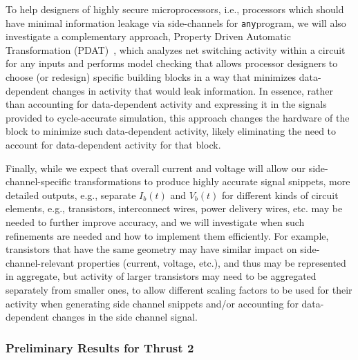 To help designers of highly secure microprocessors, i.e., processors which should have minimal information leakage via side-channels for {\tt any}program, we will also investigate a complementary approach, Property Driven Automatic Transformation (PDAT)~\cite{bleier21}, which analyzes net switching activity within a circuit for any inputs and performs model checking that allows processor designers to choose (or redesign) specific building blocks in a way that minimizes data-dependent changes in activity that would leak information. In essence, rather than accounting for data-dependent activity and expressing it in the signals provided to cycle-accurate simulation, this approach changes the hardware of the block to minimize such data-dependent activity, likely eliminating the need to account for data-dependent activity for that block.

Finally, while we expect that overall current and voltage will allow our side-channel-specific transformations to produce highly accurate signal snippets, more detailed outputs, e.g., separate $I_b(t)$ and $V_b(t)$ for different kinds of circuit elements, e.g., transistors, interconnect wires, power delivery wires, etc. may be needed to further improve accuracy, and we will investigate when such refinements are needed and how to implement them efficiently. For example, transistors that have the same geometry may have similar impact on side-channel-relevant properties (current, voltage, etc.), and thus may be represented in aggregate, but activity of larger transistors may need to be aggregated separately from smaller ones, to allow different scaling factors to be used for their activity when generating side channel snippets and/or accounting for data-dependent changes in the side channel signal.

\subsubsection{Preliminary Results for Thrust 2}

